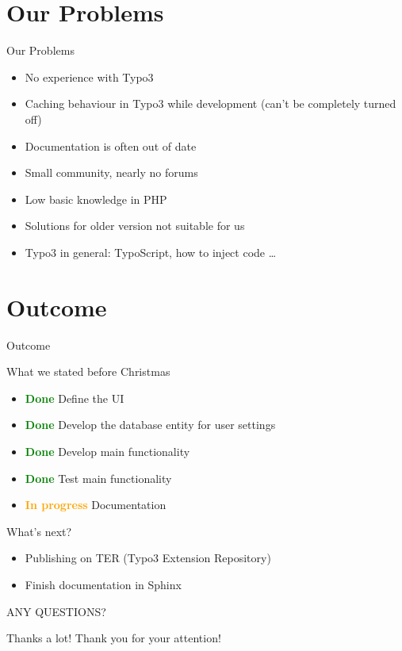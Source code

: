 \documentclass{beamer}
\begin{document}
\section{Our Problems}
\begin{frame}{Our Problems}
	\begin{itemize}
		\item No experience with Typo3
		\item Caching behaviour in Typo3 while development (can't be completely turned off)
		\item Documentation is often out of date
		\item Small community, nearly no forums
		\item Low basic knowledge in PHP
		\item Solutions for older version not suitable for us
		\item Typo3 in general: TypoScript, how to inject code \dots
	\end{itemize}
\end{frame}

\section{Outcome}
\begin{frame}{Outcome}
	
	\begin{block}{What we stated before Christmas}
			\begin{itemize}
	\item \textcolor{green}{\textbf{Done}} Define the UI
	\item \textcolor{green}{\textbf{Done}} Develop the database entity for user settings
	\item \textcolor{green}{\textbf{Done}} Develop main functionality
	\item \textcolor{green}{\textbf{Done}} Test main functionality
	\item \textcolor{orange}{\textbf{In progress}} Documentation
	\end{itemize}
	\end{block}
	
	\begin{block}{What's next?}
		\begin{itemize}
			\item Publishing on TER (Typo3 Extension Repository)
			\item Finish documentation in Sphinx
		\end{itemize}
	\end{block}
\end{frame}

\begin{frame}{}
	ANY QUESTIONS?
\end{frame}

\begin{frame}{Thanks a lot!}
	Thank you for your attention!
\end{frame}
\end{document}
